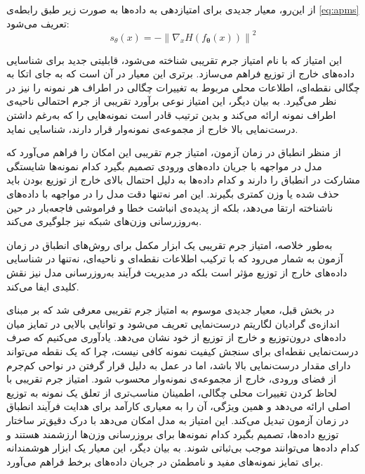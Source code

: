 از این‌رو، معیار جدیدی برای امتیازدهی به داده‌ها به صورت زیر طبق رابطه‌ی \ref{eq:apms} تعریف می‌شود:
\begin{equation}
	s_\theta(x) = - \left\| \nabla_x H(f_{\bm\theta}(x)) \right\|^2
	\label{eq:apms}
\end{equation}

این امتیاز که با نام {امتیاز جرم تقریبی} شناخته می‌شود، 
قابلیتی جدید برای شناسایی داده‌های خارج از توزیع فراهم می‌سازد. 
برتری این معیار در آن است که به جای اتکا به چگالی نقطه‌ای، 
اطلاعات محلی مربوط به تغییرات چگالی در اطراف هر نمونه را نیز در نظر می‌گیرد. 
به بیان دیگر، این امتیاز نوعی برآورد تقریبی از جرم احتمالی ناحیه‌ی اطراف نمونه ارائه می‌کند 
و بدین ترتیب قادر است نمونه‌هایی را که به‌رغم داشتن درست‌نمایی بالا خارج از مجموعه‌ی نمونه‌وار قرار دارند، شناسایی نماید.  

از منظر انطباق در زمان آزمون، امتیاز جرم تقریبی این امکان را فراهم می‌آورد که 
مدل در مواجهه با جریان داده‌های ورودی تصمیم بگیرد کدام نمونه‌ها شایستگی مشارکت در انطباق را دارند 
و کدام داده‌ها به دلیل احتمال بالای خارج از توزیع بودن باید حذف شده یا وزن کمتری بگیرند.  
این امر نه‌تنها دقت مدل را در مواجهه با داده‌های ناشناخته ارتقا می‌دهد، 
بلکه از پدیده‌ی انباشت خطا و فراموشی فاجعه‌بار در حین به‌روزرسانی وزن‌های شبکه نیز جلوگیری می‌کند.  

به‌طور خلاصه، امتیاز جرم تقریبی یک ابزار مکمل برای روش‌های انطباق در زمان آزمون به شمار می‌رود 
که با ترکیب اطلاعات نقطه‌ای و ناحیه‌ای، 
نه‌تنها در شناسایی داده‌های خارج از توزیع مؤثر است 
بلکه در مدیریت فرآیند به‌روزرسانی مدل نیز نقش کلیدی ایفا می‌کند. 


در بخش قبل، معیار جدیدی موسوم به امتیاز جرم تقریبی معرفی شد که بر مبنای اندازه‌ی گرادیان لگاریتم درست‌نمایی تعریف می‌شود 
و توانایی بالایی در تمایز میان داده‌های درون‌توزیع و خارج از توزیع از خود نشان می‌دهد. 
یادآوری می‌کنیم که صرف درست‌نمایی نقطه‌ای برای سنجش کیفیت نمونه کافی نیست، 
چرا که یک نقطه می‌تواند دارای مقدار درست‌نمایی بالا باشد، 
اما در عمل به دلیل قرار گرفتن در نواحی کم‌جرم از فضای ورودی، خارج از مجموعه‌ی نمونه‌وار محسوب شود. 
امتیاز جرم تقریبی با لحاظ کردن تغییرات محلی چگالی، 
اطمینان مناسب‌تری از تعلق یک نمونه به توزیع اصلی ارائه می‌دهد 
و همین ویژگی، آن را به معیاری کارآمد برای هدایت فرآیند انطباق در زمان آزمون تبدیل می‌کند.  
این امتیاز به مدل امکان می‌دهد با درک دقیق‌تر ساختار توزیع داده‌ها، تصمیم بگیرد کدام نمونه‌ها برای بروزرسانی وزن‌ها ارزشمند هستند و کدام داده‌ها می‌توانند موجب بی‌ثباتی شوند. به بیان دیگر، این معیار یک ابزار هوشمندانه برای تمایز نمونه‌های مفید و نامطمئن در جریان داده‌های برخط فراهم می‌آورد.

